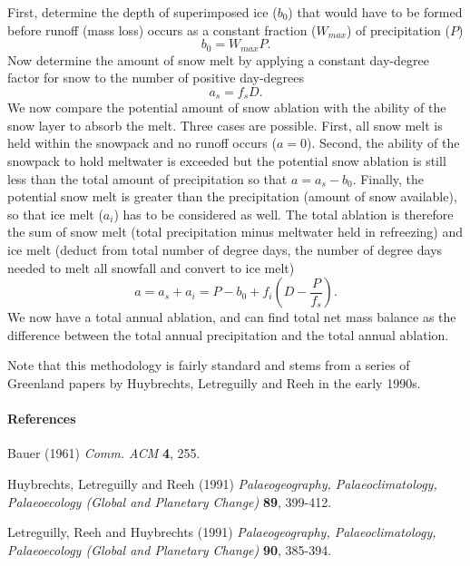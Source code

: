  First,
determine the depth of superimposed ice ($b_0$) that would have to
be formed before runoff (mass loss) occurs as a constant fraction
($W_{max}$) of precipitation ($P$)
\begin{equation}
    b_0=W_{max} P.
\end{equation}
Now determine the amount of snow melt by applying a constant
day-degree factor for snow to the number of positive day-degrees
\begin{equation}
    a_s=f_s D.
\end{equation}
We now compare the potential amount of snow ablation with the
ability of the snow layer to absorb the melt.  Three cases are
possible. First, all snow melt is held within the snowpack and no
runoff occurs ($a=0$).  Second, the ability of the snowpack to
hold meltwater is exceeded but the potential snow ablation is
still less than the total amount of precipitation so that
$a=a_s-b_0$. Finally, the potential snow melt is greater than the
precipitation (amount of snow available), so that ice melt ($a_i$)
has to be considered as well.  The total ablation is therefore the
sum of snow melt (total precipitation minus meltwater held in
refreezing) and ice melt (deduct from total number of degree days,
the number of degree days needed to melt all snowfall and convert
to ice melt)
\begin{equation}
    a=a_s + a_i = P - b_0 + f_i \left( D-\frac{P}{f_s} \right).
\end{equation}
We now have a total annual ablation, and can find total net mass
balance as the difference between the total annual precipitation
and the total annual ablation.

Note that this methodology is fairly standard and stems from a
series of Greenland papers by Huybrechts, Letreguilly and Reeh in
the early 1990s.

\paragraph{References}

Bauer (1961) \emph{Comm. ACM} \textbf{4}, 255.

Huybrechts, Letreguilly and Reeh (1991) \emph{Palaeogeography,
Palaeoclimatology, Palaeoecology (Global and Planetary Change)}
\textbf{89}, 399-412.

Letreguilly, Reeh and  Huybrechts (1991) \emph{Palaeogeography,
Palaeoclimatology, Palaeoecology (Global and Planetary Change)}
\textbf{90}, 385-394.

